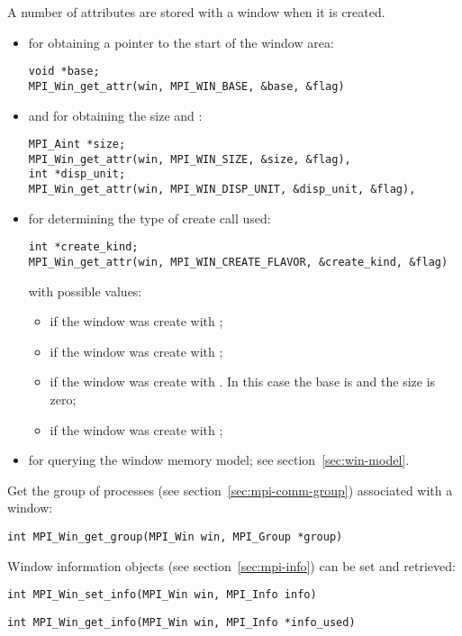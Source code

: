A number of attributes are stored with a window when it is created.
\begin{itemize}
\item {} for
  obtaining a pointer to the start of the window area:
\begin{lstlisting}
void *base;
MPI_Win_get_attr(win, MPI_WIN_BASE, &base, &flag)  
\end{lstlisting}
\item {} and  for
  obtaining the size and :
\begin{lstlisting}
MPI_Aint *size;
MPI_Win_get_attr(win, MPI_WIN_SIZE, &size, &flag), 
int *disp_unit;
MPI_Win_get_attr(win, MPI_WIN_DISP_UNIT, &disp_unit, &flag), 
\end{lstlisting}
\item {} for determining
the type of create call used:
\begin{lstlisting}
int *create_kind;
MPI_Win_get_attr(win, MPI_WIN_CREATE_FLAVOR, &create_kind, &flag)
\end{lstlisting}
with possible values:
\begin{itemize}
\item {} if the window was create
  with ;
\item {} if the window was create
  with ;
\item {} if the window was create
  with . In this case the base is
   and the size is zero;
\item {} if the window was create
  with ;
\end{itemize}
\item {} for
  querying the window memory model; see section~\ref{sec:win-model}.
\end{itemize}

Get the group of processes (see section~\ref{sec:mpi-comm-group})
associated with a window:
\begin{lstlisting}
int MPI_Win_get_group(MPI_Win win, MPI_Group *group) 
\end{lstlisting}

Window information objects (see section~\ref{sec:mpi-info})
can be set and retrieved:
\begin{lstlisting}
int MPI_Win_set_info(MPI_Win win, MPI_Info info)
\end{lstlisting}
\begin{lstlisting}
int MPI_Win_get_info(MPI_Win win, MPI_Info *info_used)
\end{lstlisting}

